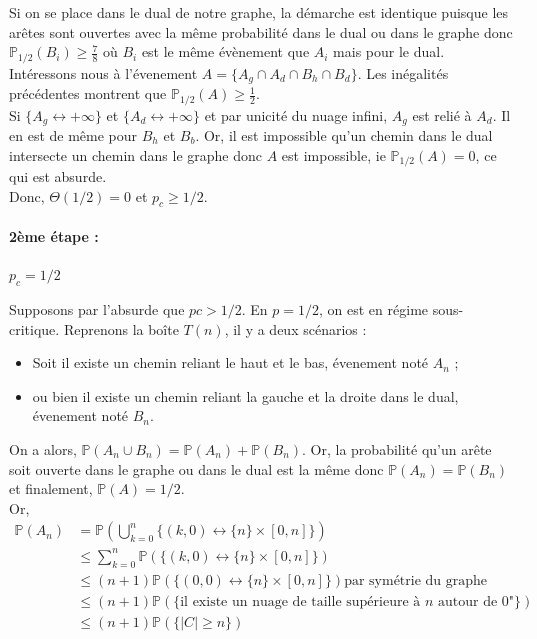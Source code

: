 \documentclass[11pt,a4paper]{article}
\begin{document}
Si on se place dans le dual de notre graphe, la démarche est identique puisque les arêtes sont ouvertes avec la même probabilité dans le dual ou dans le graphe donc $\mathbb{P}_{1/2}\left(B_i\right) \ge \frac{7}{8}$ où $B_i$ est le même évènement que  $A_i$ mais pour le dual.
\\

Intéressons nous à l'évenement $A = \{A_g \cap A_d \cap B_h \cap B_d\}$. Les inégalités précédentes montrent que $\mathbb{P}_{1/2}\left(A\right) \ge \frac{1}{2}$.
\\

Si $\{A_g \leftrightarrow +\infty\}$ et $\{A_d \leftrightarrow +\infty\}$ et par unicité du nuage infini, $A_g$ est relié à $A_d$. Il en est de même pour $B_h$ et $B_b$. Or, il est impossible qu'un chemin dans le dual intersecte un chemin dans le graphe donc $A$ est impossible, ie $\mathbb{P}_{1/2}\left(A\right)=0$, ce qui est absurde.
\\

Donc, $\Theta\left(1/2\right) = 0$ et $p_c \ge 1/2$.

\paragraph{2ème étape :}

$p_c = 1/2$

Supposons par l'absurde que $pc > 1/2$. En $p = 1/2$, on est en régime sous-critique. Reprenons la boîte $T(n)$, il y a deux scénarios :

\begin{itemize}
    \item Soit il existe un chemin reliant le haut et le bas, évenement noté $A_n$ ;
    \item ou bien il existe un chemin reliant la gauche et la droite dans le dual, évenement noté $B_n$.
\end{itemize}

On a alors, $\mathbb{P}\left(A_n \cup B_n\right) = \mathbb{P}\left(A_n\right)+\mathbb{P}\left(B_n\right)$. Or, la probabilité qu'un arête soit ouverte dans le graphe ou dans le dual est la même donc $\mathbb{P}\left(A_n\right) = \mathbb{P}\left(B_n\right)$ et finalement, $\mathbb{P}\left(A\right) = 1/2$. 
\\

Or, 
\begin{align*}
    \mathbb{P}\left(A_n\right) &= \mathbb{P}\left(\bigcup_{k=0}^n \{ (k,0) \leftrightarrow \{n\}\times[0,n]\} \right)\\
    &\le \sum_{k=0}^n \mathbb{P}\left(\{ (k,0) \leftrightarrow \{n\}\times[0,n]\}\right) \\
    &\le \left(n+1\right) \mathbb{P}\left(\{ (0,0) \leftrightarrow \{n\}\times[0,n]\}\right) \text{par symétrie du graphe} \\
    &\le \left(n+1\right) \mathbb{P}\left(\{\text{il existe un nuage de taille supérieure à $n$ autour de $0$"}\}\right)\\
    &\le \left(n+1\right)\mathbb{P}\left(\{|C|\ge n\}\right)
\end{align*}
\end{document}
